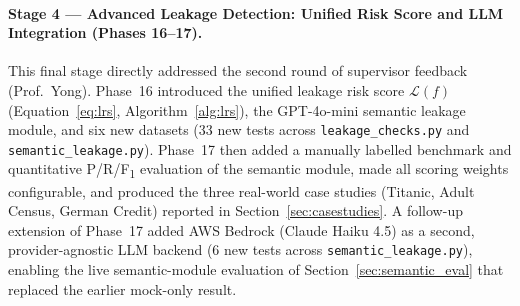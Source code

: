 \documentclass[12pt,a4paper]{report}
\begin{document}
\paragraph{Stage 4 --- Advanced Leakage Detection: Unified Risk Score and LLM Integration
(Phases 16--17).}  This final stage directly addressed the second round of supervisor
feedback (Prof.\ Yong).  Phase~16 introduced the unified leakage risk score
$\mathcal{L}(f)$ (Equation~\eqref{eq:lrs}, Algorithm~\ref{alg:lrs}), the GPT-4o-mini
semantic leakage module, and six new datasets (33 new tests across
\texttt{leakage\_checks.py} and \texttt{semantic\_leakage.py}).  Phase~17 then added a
manually labelled benchmark and quantitative P/R/F\textsubscript{1} evaluation of the
semantic module, made all scoring weights configurable, and produced the three real-world
case studies (Titanic, Adult Census, German Credit) reported in
Section~\ref{sec:casestudies}.  A follow-up extension of Phase~17 added AWS Bedrock
(Claude Haiku 4.5) as a second, provider-agnostic LLM backend (6 new tests across
\texttt{semantic\_leakage.py}), enabling the live semantic-module evaluation of
Section~\ref{sec:semantic_eval} that replaced the earlier mock-only result.
\end{document}
